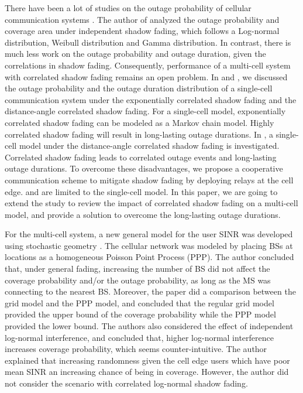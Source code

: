 \documentclass[journal,10pt]{IEEEtran}
\begin{document}
\par There have been a lot of studies on the outage probability of cellular communication systems \cite{abu1991outage, petrovic2013outage, emamian2014outage}. The author of \cite{vural2015effect} analyzed the outage probability and coverage area under independent shadow fading, which follows a Log-normal distribution, Weibull distribution and Gamma distribution. In contrast, there is much less work on the outage probability and outage duration, given the correlations in shadow fading. Consequently, performance of a multi-cell system with correlated shadow fading remains an open problem. In \cite{lu2015long} and \cite{lu2015shining}, we discussed the outage probability and the outage duration distribution of a single-cell communication system under the exponentially correlated shadow fading and the distance-angle correlated shadow fading. For a single-cell model, exponentially correlated shadow fading can be modeled as a Markov chain model. Highly correlated shadow fading will result in long-lasting outage durations. In \cite{lu2015shining}, a single-cell model under the distance-angle correlated shadow fading is investigated. Correlated shadow fading leads to correlated outage events and long-lasting outage durations. To overcome these disadvantages, we propose a cooperative communication scheme to mitigate shadow fading by deploying relays at the cell edge. \cite{lu2015long} and \cite{lu2015shining} are limited to the single-cell model. In this paper, we are going to extend the study to review the impact of correlated shadow fading on a multi-cell model, and provide a solution to overcome the long-lasting outage durations.
\par For the multi-cell system, a new general model for the user SINR was developed using stochastic geometry \cite{andrews2011tractable}. The cellular network was modeled by placing BSs at locations as a homogeneous Poisson Point Process (PPP). The author concluded that, under general fading, increasing the number of BS did not affect the coverage probability and/or the outage probability, as long as the MS was connecting to the nearest BS. Moreover, the paper did a comparison between the grid model and the PPP model, and concluded that the regular grid model provided the upper bound of the coverage probability while the PPP model provided the lower bound. The authors also considered the effect of independent log-normal interference, and concluded that, higher log-normal interference increases coverage probability, which seems counter-intuitive. The author explained that increasing randomness given the cell edge users which have poor mean SINR an increasing chance of being in coverage. However, the author did not consider the scenario with correlated log-normal shadow fading. 
\end{document}
